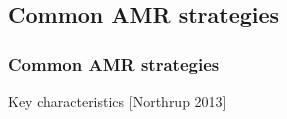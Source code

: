 \documentclass{beamer}
\begin{document}
\subsection[AMR types]{Common AMR strategies}
\begin{frame}%
\frametitle{Common AMR strategies}
\tiny
\begin{minipage}[t][1\textheight]{1\textwidth}
\vspace{-15pt}
\begin{exampleblock}{Key characteristics}
[Northrup 2013]
\vspace{-20pt}
\begin{figure} \label{fig:AMRtypes}
\centering
{}

\end{figure}
\end{exampleblock}
\end{minipage}
\end{frame}
\end{document}

